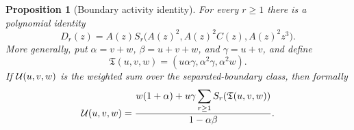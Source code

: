 \documentclass[11pt,letterpaper]{article}
\newtheorem{proposition}[theorem]{Proposition}
\theoremstyle{definition}
\begin{document}
\begin{proposition}[Boundary activity identity]\label{ska:prop:transform}
For every $r\ge1$ there is a polynomial identity
\begin{equation}\label{ska:eq:transform}
D_r(z)=A(z)S_r\bigl(A(z)^2,A(z)^2C(z),A(z)^2z^3\bigr).
\end{equation}
More generally, put $\alpha=v+w$, $\beta=u+v+w$, and $\gamma=u+v$, and define
\begin{equation}\label{ska:eq:Tmap}
\mathfrak T(u,v,w)=(u\alpha\gamma,\alpha^2\gamma,\alpha^2w).
\end{equation}
If $\mathcal U(u,v,w)$ is the weighted sum over the separated-boundary class, then formally
\begin{equation}\label{ska:eq:generalrenewal}
\mathcal U(u,v,w)=
\frac{w(1+\alpha)+u\gamma\displaystyle\sum_{r\ge1}S_r(\mathfrak T(u,v,w))}
{1-\alpha\beta}.
\end{equation}
\end{proposition}
\end{document}

